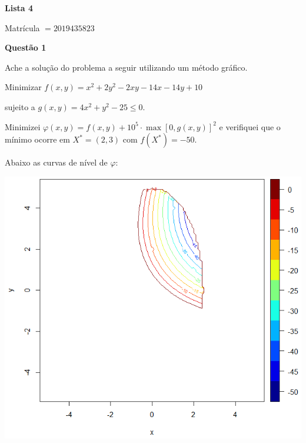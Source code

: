 \documentclass{rbfin}
\begin{document}
\rbfe{}

\begin{center}
\Large

\textbf{Lista 4}

\normalsize

Matrícula $= 2019435823$
\end{center}

\large

\textbf{Questão 1}

\normalsize

\vspace{6mm}

\doublespacing

Ache a solução do problema a seguir utilizando um método gráfico.

Minimizar $f(x, y ) = x^2 + 2y^2 -2xy - 14x - 14y + 10$

sujeito a $g(x, y) = 4x^2 + y^2 - 25 \le 0$.

Minimizei $\varphi(x,y) = f(x,y) + 10^5 \cdot \max[0,g(x,y)]^2$ e verifiquei que o mínimo ocorre em $X^* = (2, 3)$ com $f(X^*) = -50$. 

Abaixo as curvas de nível de $\varphi$:

\begin{center}
\includegraphics[scale=0.75]{H}
\end{center}
\end{document}
